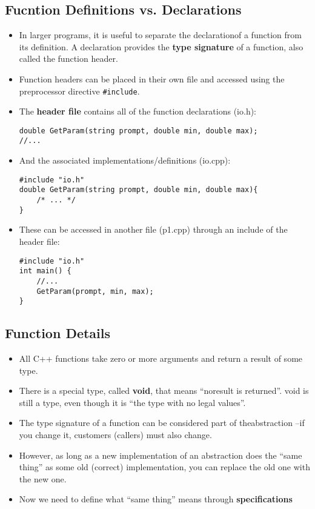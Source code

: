 \subsection{Fucntion Definitions vs. Declarations}
\begin{itemize}
	\item In larger programs, it is useful to separate the declarationof a function from its definition. A declaration provides the \textbf{type signature} of a function, also called the function header.
	\item Function headers can be placed in their own file and accessed using the preprocessor directive \lstinline[style=bash]{#include}.
	\item The \textbf{header file} contains all of the function declarations (io.h):
\begin{lstlisting}[style=C++]
double GetParam(string prompt, double min, double max);
//...
\end{lstlisting}
	
	\item And the associated implementations/definitions (io.cpp):
\begin{lstlisting}[style=C++]
#include "io.h"
double GetParam(string prompt, double min, double max){
	/* ... */
}
\end{lstlisting}

	\item These can be accessed in another file (p1.cpp) through an include of the header file:
\begin{lstlisting}[style=C++]
#include "io.h"
int main() {
	//...
	GetParam(prompt, min, max);
}
\end{lstlisting}
\end{itemize}

\subsection{Function Details}
\begin{itemize}
	\item All C++ functions take zero or more arguments and return a result of some type.
	\item There is a special type, called \textbf{void}, that means ``noresult is returned''. void is still a type, even though it is ``the type with no legal values''.
	\item The type signature of a function can be considered part of theabstraction –if you change it, customers (callers) must also change.
	\item However, as long as a new implementation of an abstraction does the ``same thing'' as some old (correct) implementation, you can replace the old one with the new one.
	\item Now we need to define what ``same thing'' means through \textbf{specifications}
\end{itemize}

